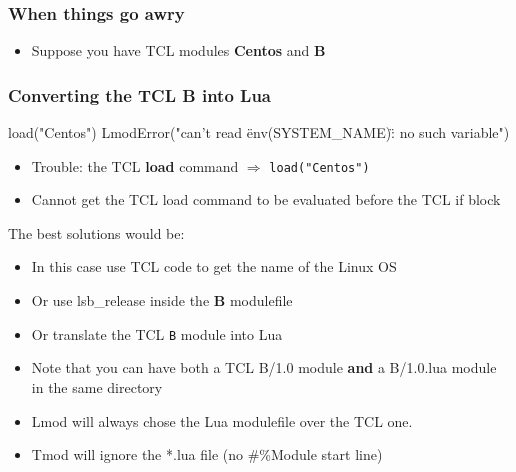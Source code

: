 \documentclass{beamer}
\begin{document}
\begin{frame}[fragile]
    \frametitle{When things go awry}
  \begin{itemize}
    \item Suppose you have TCL modules \textbf{Centos} and \textbf{B}
  \end{itemize}
 {\tiny
}
\end{frame}

\begin{frame}[fragile]
    \frametitle{Converting the TCL \textbf{B} into Lua}
 {\tiny
    \begin{semiverbatim}
   load("Centos")
   LmodError("can't read \"env(SYSTEM\_NAME)\": no such variable")
    \end{semiverbatim}
}
  \begin{itemize}
    \item Trouble: the TCL \textbf{load} command $\Rightarrow$
      \texttt{load("Centos")}
    \item Cannot get the TCL load command to be evaluated before the
      TCL if block
  \end{itemize}

\end{frame}


\begin{frame}{The best solutions would be: }
  \begin{itemize}
    \item In this case use TCL code to get the name of the Linux OS 
    \item Or use lsb\_release inside the \textbf{B} modulefile
    \item Or translate the TCL \texttt{B} module into Lua
    \item Note that you can have both a TCL B/1.0 module \textbf{and}
      a B/1.0.lua module in the same directory
    \item Lmod will always chose the Lua modulefile over the TCL one.
    \item Tmod will ignore the *.lua file (no \#\%Module start line)
  \end{itemize}
\end{frame}
\end{document}
